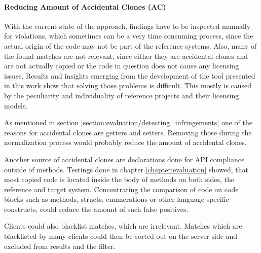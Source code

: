\paragraph{Reducing Amount of Accidental Clones (AC)}
With the current state of the approach, findings have to be inspected manually for violations, which sometimes can be a very time consuming process, since the actual origin of the code may not be part of the reference systems.
Also, many of the found matches are not relevant, since either they are accidental clones and are not actually copied or the code in question does not cause any licensing issues.
Results and insights emerging from the development of the tool presented in this work show that solving those problems is difficult.
This mostly is caused by the peculiarity and individuality of reference projects and their licensing models.

As mentioned in section \ref{section:evaluation/detecting_infringements} one of the reasons for accidental clones are getters and setters.
Removing those during the normalization process would probably reduce the amount of accidental clones.

Another source of accidental clones are declarations done for API compliance outside of methods.
Testings done in chapter \ref{chapter:evaluation} showed, that most copied code is located inside the body of methods on both sides, the reference and target system.
Concentrating the comparison of code on code blocks such as methods, structs, enumerations or other language specific constructs, could reduce the amount of such false positives.

Clients could also blacklist matches, which are irrelevant.
Matches which are blacklisted by many clients could then be sorted out on the server side and excluded from results and the filter.

